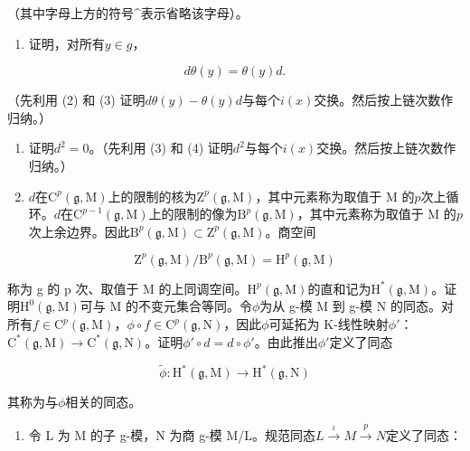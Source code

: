 （其中字母上方的符号\^{}表示省略该字母）。

\begin{enumerate}
\def\labelenumi{(\alph{enumi})}
\setcounter{enumi}{2}
\tightlist
\item
  证明，对所有\(y \in g\)，
\end{enumerate}

\[
d \theta (y) = \theta (y) d.\tag{4}
\]

（先利用 (2) 和 (3) 证明\(d\theta(y) - \theta(y)d\)与每个\(i(x)\)交换。然后按上链次数作归纳。）

\begin{enumerate}
\def\labelenumi{(\alph{enumi})}
\setcounter{enumi}{3}
\item
  证明\(d^2 = 0\)。（先利用 (3) 和 (4) 证明\(d^2\)与每个\(i(x)\)交换。然后按上链次数作归纳。）
\item
  \(d\)在\(\mathrm{C}^p (\mathfrak{g},\mathrm{M})\)上的限制的核为\(\mathrm{Z}^p (\mathfrak{g},\mathrm{M})\)，其中元素称为取值于 M 的\(p\)次上循环。\(d\)在\(\mathrm{C}^{p - 1}(\mathfrak{g},\mathrm{M})\)上的限制的像为\(\mathrm{B}^p (\mathfrak{g},\mathrm{M})\)，其中元素称为取值于 M 的\(p\)次上余边界。因此\(\mathrm{B}^p (\mathfrak{g},\mathrm{M})\subset \mathrm{Z}^p (\mathfrak{g},\mathrm{M})\)。商空间
\end{enumerate}

\[
\mathrm{Z} ^ {p} (\mathfrak {g}, \mathrm{M}) / \mathrm{B} ^ {p} (\mathfrak {g}, \mathrm{M}) = \mathrm{H} ^ {p} (\mathfrak {g}, \mathrm{M})
\]

称为 g 的 p 次、取值于 M 的上同调空间。\(\mathrm{H}^{p}(\mathfrak{g},\mathrm{M})\)的直和记为\(\mathrm{H}^{*}(\mathfrak{g},\mathrm{M})\)。证明\(\mathrm{H}^{0}(\mathfrak{g},\mathrm{M})\)可与 M 的不变元集合等同。令\(\phi\)为从 g-模 M 到 g-模 N 的同态。对所有\(f \in \mathrm{C}^{p}(\mathfrak{g},\mathrm{M})\)，\(\phi \circ f \in \mathrm{C}^{p}(\mathfrak{g},\mathrm{N})\)，因此\(\phi\)可延拓为 K-线性映射\(\phi'\)：\(\mathrm{C}^{*}(\mathfrak{g},\mathrm{M}) \to \mathrm{C}^{*}(\mathfrak{g},\mathrm{N})\)。证明\(\phi' \circ d = d \circ \phi'\)。由此推出\(\phi'\)定义了同态

\[
\tilde {\phi} \colon \mathrm{H} ^ {*} (\mathfrak {g}, \mathrm{M}) \to \mathrm{H} ^ {*} (\mathfrak {g}, \mathrm{N})
\]

其称为与\(\phi\)相关的同态。

\begin{enumerate}
\def\labelenumi{(\alph{enumi})}
\setcounter{enumi}{5}
\tightlist
\item
  令 L 为 M 的子 g-模，N 为商 g-模 M/L。规范同态\(L \stackrel{\iota}{\rightarrow} M \stackrel{p}{\rightarrow} N\)定义了同态：
\end{enumerate}

